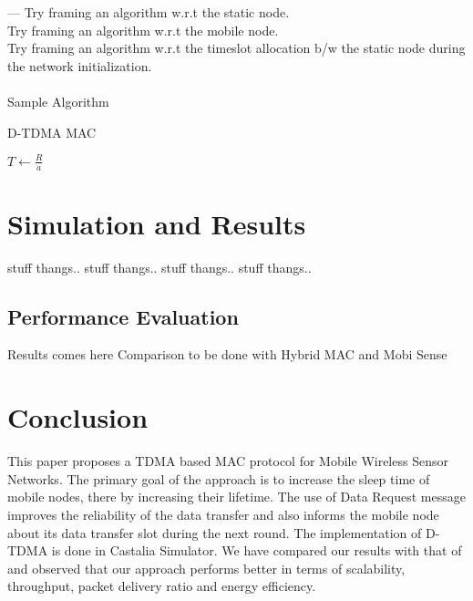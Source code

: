 \documentclass[a4paper, conference, 10pt]{IEEEtran}
\begin{document}
--- Try framing an algorithm w.r.t the static node. \\

Try framing an algorithm w.r.t the mobile node. \\

Try framing an algorithm w.r.t the timeslot allocation b/w the static node during the network initialization. \\ \\

Sample Algorithm
\begin{algorithm}[H]
\caption{D-TDMA MAC}
\begin{algorithmic}[1]
    \State $T \leftarrow \frac{R}{a}$
      
\EndProcedure
\end{algorithmic}
\end{algorithm}
\fi
\section{Simulation and Results}
\label{sim}
stuff thangs.. stuff thangs..
stuff thangs.. stuff thangs..
\subsection{Performance Evaluation}         

Results comes here
Comparison to be done with Hybrid MAC and Mobi Sense

\section{Conclusion}
\label{conclusion}
This paper proposes a TDMA based MAC protocol for Mobile Wireless Sensor Networks. The primary goal of the approach is to increase the sleep time of mobile nodes, there by increasing their lifetime. The use of Data Request message improves the reliability of the data transfer and also informs the mobile node about its data transfer slot during the next round. The implementation of D-TDMA is done in Castalia Simulator. We have compared our results with that of \cite{hmac} and observed that our approach performs better in terms of scalability, throughput, packet delivery ratio and energy efficiency.



\end{document}
